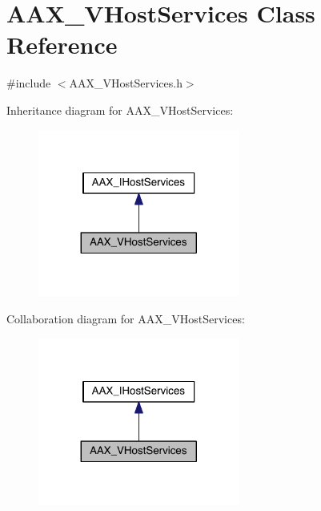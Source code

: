 \hypertarget{a00137}{}\section{A\+A\+X\+\_\+\+V\+Host\+Services Class Reference}
\label{a00137}


{\ttfamily \#include $<$A\+A\+X\+\_\+\+V\+Host\+Services.\+h$>$}



Inheritance diagram for A\+A\+X\+\_\+\+V\+Host\+Services\+:
\nopagebreak
\begin{figure}[H]
\begin{center}
\leavevmode
\includegraphics[width=188pt]{a00707}
\end{center}
\end{figure}


Collaboration diagram for A\+A\+X\+\_\+\+V\+Host\+Services\+:
\nopagebreak
\begin{figure}[H]
\begin{center}
\leavevmode
\includegraphics[width=188pt]{a00708}
\end{center}
\end{figure}


